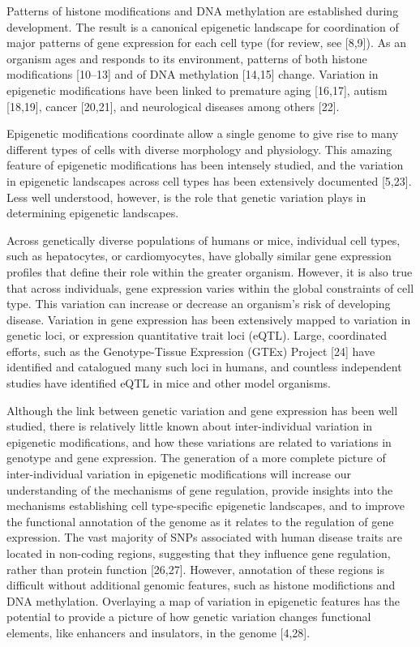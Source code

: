 \documentclass[10pt,letterpaper]{article}
\begin{document}
Patterns of histone modifications and DNA methylation are established
during development. The result is a canonical epigenetic landscape for
coordination of major patterns of gene expression for each cell type
(for review, see {[}8,9{]}). As an organism ages and responds to its
environment, patterns of both histone modifications {[}10--13{]} and of
DNA methylation {[}14,15{]} change. Variation in epigenetic
modifications have been linked to premature aging {[}16,17{]}, autism
{[}18,19{]}, cancer {[}20,21{]}, and neurological diseases among others
{[}22{]}.

Epigenetic modifications coordinate allow a single genome to give rise
to many different types of cells with diverse morphology and physiology.
This amazing feature of epigenetic modifications has been intensely
studied, and the variation in epigenetic landscapes across cell types
has been extensively documented {[}5,23{]}. Less well understood,
however, is the role that genetic variation plays in determining
epigenetic landscapes.

Across genetically diverse populations of humans or mice, individual
cell types, such as hepatocytes, or cardiomyocytes, have globally
similar gene expression profiles that define their role within the
greater organism. However, it is also true that across individuals, gene
expression varies within the global constraints of cell type. This
variation can increase or decrease an organism's risk of developing
disease. Variation in gene expression has been extensively mapped to
variation in genetic loci, or expression quantitative trait loci (eQTL).
Large, coordinated efforts, such as the Genotype-Tissue Expression
(GTEx) Project {[}24{]} have identified and catalogued many such loci in
humans, and countless independent studies have identified eQTL in mice
and other model organisms.

Although the link between genetic variation and gene expression has been
well studied, there is relatively little known about inter-individual
variation in epigenetic modifications, and how these variations are
related to variations in genotype and gene expression. The generation of
a more complete picture of inter-individual variation in epigenetic
modifications will increase our understanding of the mechanisms of gene
regulation, provide insights into the mechanisms establishing cell
type-specific epigenetic landscapes, and to improve the functional
annotation of the genome as it relates to the regulation of gene
expression. The vast majority of SNPs associated with human disease
traits are located in non-coding regions, suggesting that they influence
gene regulation, rather than protein function {[}26,27{]}. However,
annotation of these regions is difficult without additional genomic
features, such as histone modifictions and DNA methylation. Overlaying a
map of variation in epigenetic features has the potential to provide a
picture of how genetic variation changes functional elements, like
enhancers and insulators, in the genome {[}4,28{]}.
\end{document}
